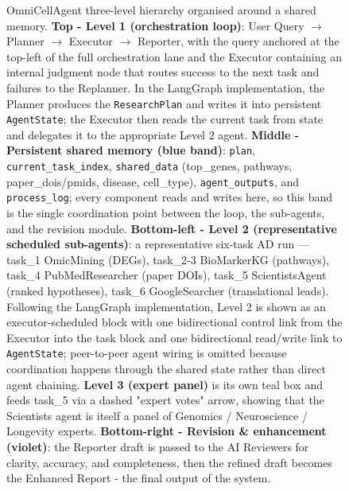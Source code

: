 \begin{figure}[!htbp]
{\begin{tikzpicture}
\end{tikzpicture}%
}%

\caption{OmniCellAgent three-level hierarchy organised around a shared memory. \textbf{Top - Level 1 (orchestration loop)}: User Query $\to$ Planner $\to$ Executor $\to$ Reporter, with the query anchored at the top-left of the full orchestration lane and the Executor containing an internal judgment node that routes success to the next task and failures to the Replanner. In the LangGraph implementation, the Planner produces the \texttt{ResearchPlan} and writes it into persistent \texttt{AgentState}; the Executor then reads the current task from state and delegates it to the appropriate Level 2 agent. \textbf{Middle - Persistent shared memory (blue band)}: \texttt{plan}, \texttt{current\_task\_index}, \texttt{shared\_data} (top\_genes, pathways, paper\_dois/pmids, disease, cell\_type), \texttt{agent\_outputs}, and \texttt{process\_log}; every component reads and writes here, so this band is the single coordination point between the loop, the sub-agents, and the revision module. \textbf{Bottom-left - Level 2 (representative scheduled sub-agents)}: a representative six-task AD run --- task\_1 OmicMining (DEGs), task\_2-3 BioMarkerKG (pathways), task\_4 PubMedResearcher (paper DOIs), task\_5 ScientistsAgent (ranked hypotheses), task\_6 GoogleSearcher (translational leads). Following the LangGraph implementation, Level 2 is shown as an executor-scheduled block with one bidirectional control link from the Executor into the task block and one bidirectional read/write link to \texttt{AgentState}; peer-to-peer agent wiring is omitted because coordination happens through the shared state rather than direct agent chaining. \textbf{Level 3 (expert panel)} is its own teal box and feeds task\_5 via a dashed "expert votes" arrow, showing that the Scientists agent is itself a panel of Genomics / Neuroscience / Longevity experts. \textbf{Bottom-right - Revision \& enhancement (violet)}: the Reporter draft is passed to the AI Reviewers for clarity, accuracy, and completeness, then the refined draft becomes the Enhanced Report - the final output of the system.}
\label{fig:architecture-v2}
\end{figure}
